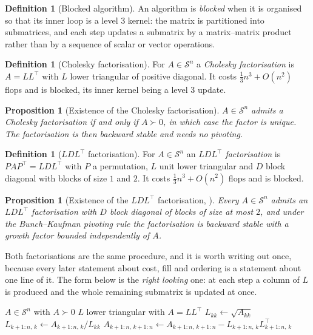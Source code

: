 \documentclass[a4paper,11pt]{book}
\theoremstyle{plain}
\newtheorem{proposition}[theorem]{Proposition}
\theoremstyle{definition}
\newtheorem{definition}[theorem]{Definition}
\theoremstyle{remark}
\numberwithin{equation}{chapter}
\numberwithin{algorithm}{chapter}
\newcommand{\Sp}{\mathcal{S}}
\begin{document}
	
	\begin{definition}[Blocked algorithm]
		An algorithm is \emph{blocked} when it is organised so that its inner loop is
		a level 3 kernel: the matrix is partitioned into submatrices, and each step
		updates a submatrix by a matrix--matrix product rather than by a sequence of
		scalar or vector operations. 
	\end{definition}
	\begin{definition}[Cholesky factorisation]
		For $A\in\Sp^n$ a \emph{Cholesky factorisation} is $A=LL^\top$ with $L$ lower
		triangular of positive diagonal. It costs $\tfrac13n^3+O(n^2)$ flops and is
		blocked, its inner kernel being a level 3 update.
	\end{definition}
	
	\begin{proposition}[Existence of the Cholesky factorisation]
		$A\in\Sp^n$ admits a Cholesky factorisation if and only if $A\succ0$, in which
		case the factor is unique. The factorisation is then backward stable and needs
		no pivoting.
	\end{proposition}
	
	\begin{definition}[$LDL^\top$ factorisation]
		For $A\in\Sp^n$ an \emph{$LDL^\top$ factorisation} is $PAP^\top=LDL^\top$ with
		$P$ a permutation, $L$ unit lower triangular and $D$ block diagonal with blocks
		of size $1$ and $2$. It costs $\tfrac13n^3+O(n^2)$ flops and is blocked.
	\end{definition}
	
	\begin{proposition}[Existence of the $LDL^\top$ factorisation, \cite{BunchKaufman1977}]
		Every $A\in\Sp^n$ admits an $LDL^\top$ factorisation with $D$ block diagonal of
		blocks of size at most $2$, and under the Bunch--Kaufman pivoting rule the
		factorisation is backward stable with a growth factor bounded independently of
		$A$. 
	\end{proposition}
	
	Both factorisations are the same procedure, and it is worth writing out once,
	because every later statement about cost, fill and ordering is a statement
	about one line of it. The form below is the \emph{right looking} one: at each
	step a column of $L$ is produced and the whole remaining submatrix is updated
	at once.

	\begin{algorithm}[H]
		\caption{Cholesky, right looking}
		\begin{algorithmic}[1]
			\Require $A\in\Sp^n$ with $A\succ0$
			\Ensure $L$ lower triangular with $A=LL^{\top}$
			\State $L_{kk}\gets\sqrt{A_{kk}}$
			\State $L_{k+1:n,\,k}\gets A_{k+1:n,\,k}/L_{kk}$
			\State $A_{k+1:n,\,k+1:n}\gets A_{k+1:n,\,k+1:n}
			-L_{k+1:n,\,k}L_{k+1:n,\,k}^{\top}$
			\EndFor
		\end{algorithmic}
	\end{algorithm}
\end{document}
